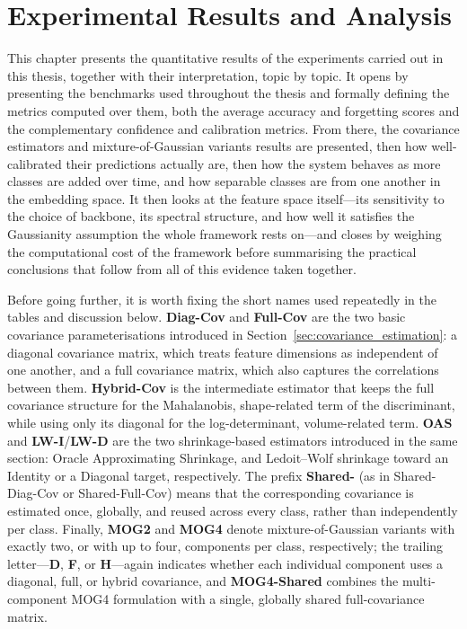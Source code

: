 \chapter{Experimental Results and Analysis}
\label{ch:results}
\label{ch:analysis}

This chapter presents the quantitative results of the experiments carried out in this thesis, together with their interpretation, topic by topic. It opens by presenting the benchmarks used throughout the thesis and formally defining the metrics computed over them, both the average accuracy and forgetting scores and the complementary confidence and calibration metrics. From there, the covariance estimators and mixture-of-Gaussian variants results are presented, then how well-calibrated their predictions actually are, then how the system behaves as more classes are added over time, and how separable classes are from one another in the embedding space. It then looks at the feature space itself---its sensitivity to the choice of backbone, its spectral structure, and how well it satisfies the Gaussianity assumption the whole framework rests on---and closes by weighing the computational cost of the framework before summarising the practical conclusions that follow from all of this evidence taken together.

Before going further, it is worth fixing the short names used repeatedly in the tables and discussion below. \textbf{Diag-Cov} and \textbf{Full-Cov} are the two basic covariance parameterisations introduced in Section~\ref{sec:covariance_estimation}: a diagonal covariance matrix, which treats feature dimensions as independent of one another, and a full covariance matrix, which also captures the correlations between them. \textbf{Hybrid-Cov} is the intermediate estimator that keeps the full covariance structure for the Mahalanobis, shape-related term of the discriminant, while using only its diagonal for the log-determinant, volume-related term. \textbf{OAS} and \textbf{LW-I}/\textbf{LW-D} are the two shrinkage-based estimators introduced in the same section: Oracle Approximating Shrinkage, and Ledoit--Wolf shrinkage toward an Identity or a Diagonal target, respectively. The prefix \textbf{Shared-} (as in Shared-Diag-Cov or Shared-Full-Cov) means that the corresponding covariance is estimated once, globally, and reused across every class, rather than independently per class. Finally, \textbf{MOG2} and \textbf{MOG4} denote mixture-of-Gaussian variants with exactly two, or with up to four, components per class, respectively; the trailing letter---\textbf{D}, \textbf{F}, or \textbf{H}---again indicates whether each individual component uses a diagonal, full, or hybrid covariance, and \textbf{MOG4-Shared} combines the multi-component MOG4 formulation with a single, globally shared full-covariance matrix.

